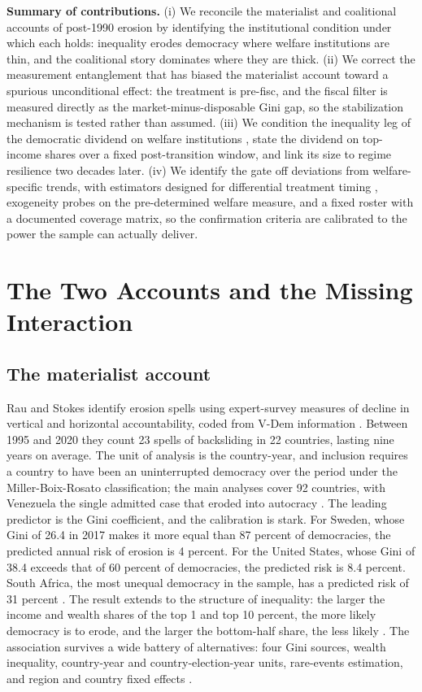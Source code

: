 \textbf{Summary of contributions.} (i) We reconcile the materialist and coalitional accounts of post-1990 erosion by identifying the institutional condition under which each holds: inequality erodes democracy where welfare institutions are thin, and the coalitional story dominates where they are thick. (ii) We correct the measurement entanglement that has biased the materialist account toward a spurious unconditional effect: the treatment is pre-fisc, and the fiscal filter is measured directly as the market-minus-disposable Gini gap, so the stabilization mechanism is tested rather than assumed. (iii) We condition the inequality leg of the democratic dividend on welfare institutions \citep{AcemogluNaidu2015}, state the dividend on top-income shares over a fixed post-transition window, and link its size to regime resilience two decades later. (iv) We identify the gate off deviations from welfare-specific trends, with estimators designed for differential treatment timing \citep{Callaway2021, SunAbraham2021}, exogeneity probes on the pre-determined welfare measure, and a fixed roster with a documented coverage matrix, so the confirmation criteria are calibrated to the power the sample can actually deliver.

\section{The Two Accounts and the Missing Interaction}

\subsection{The materialist account}

Rau and Stokes identify erosion spells using expert-survey measures of decline in vertical and horizontal accountability, coded from V-Dem information \citep{RauStokes2025}. Between 1995 and 2020 they count 23 spells of backsliding in 22 countries, lasting nine years on average. The unit of analysis is the country-year, and inclusion requires a country to have been an uninterrupted democracy over the period under the Miller-Boix-Rosato classification; the main analyses cover 92 countries, with Venezuela the single admitted case that eroded into autocracy \citep{RauStokes2025, BoixMiller2013}. The leading predictor is the Gini coefficient, and the calibration is stark. For Sweden, whose Gini of 26.4 in 2017 makes it more equal than 87 percent of democracies, the predicted annual risk of erosion is 4 percent. For the United States, whose Gini of 38.4 exceeds that of 60 percent of democracies, the predicted risk is 8.4 percent. South Africa, the most unequal democracy in the sample, has a predicted risk of 31 percent \citep{RauStokes2025}. The result extends to the structure of inequality: the larger the income and wealth shares of the top 1 and top 10 percent, the more likely democracy is to erode, and the larger the bottom-half share, the less likely \citep{RauStokes2025}. The association survives a wide battery of alternatives: four Gini sources, wealth inequality, country-year and country-election-year units, rare-events estimation, and region and country fixed effects \citep{RauStokes2025}.

